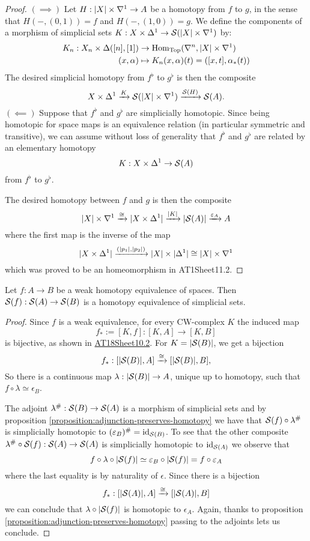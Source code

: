 \begin{proof}
$(\implies)$ Let $H:|X|\times\sx{1}\to A$ be a homotopy from $f$ to $g$, in the sense that $H(-,(0,1))=f$ and $H(-,(1,0))=g$. We define the components of a morphism of simplicial sets $K:X\times\Delta^1\to\S(|X|\times\sx{1})$ by:
\begin{align*}
    K_n:X_n\times\Delta([n],[1])&\to\Hom_\Top(\ns,|X|\times\sx{1})\\
    (x,\alpha)&\mapsto K_n(x,\alpha)(t)=([x,t],\alpha_*(t))
\end{align*}
The desired simplicial homotopy from $f^\flat$ to $g^\flat$ is then the composite
\[X\times\Delta^1\xto{K}\S(|X|\times\sx{1})\xto{\S(H)}\S(A).\]
$(\impliedby)$ Suppose that $f^\flat$ and $g^\flat$ are simplicially homotopic. Since being homotopic for space maps is an equivalence relation (in particular symmetric and transitive), we can assume without loss of generality that $f^\flat$ and $g^\flat$ are related by an elementary homotopy
\[K:X\times\Delta^1\to\S(A)\]
from $f^\flat$ to $g^\flat$.

The desired homotopy between $f$ and $g$ is then the composite
\[|X|\times\sx{1}\xto{\cong}|X\times\Delta^1|\xto{|K|}|\S(A)|\xto{\epsilon_A}A\]
where the first map is the inverse of the map
\[|X\times\Delta^1|\xto{(|p_1|,|p_2|)}|X|\times|\Delta^1|\cong|X|\times\sx{1}\]
which was proved to be an homeomorphism in AT1Sheet11.2.
\end{proof}

\begin{theorem}\label{theore:singular-complex-functor-is-homotopical}
Let $f:A\to B$ be a weak homotopy equivalence of spaces. Then $\S(f):\S(A)\to\S(B)$ is a homotopy equivalence of simplicial sets.
\end{theorem}

\begin{proof}
Since $f$ is a weak equivalence, for every CW-complex $K$ the induced map
\[f_*:=[K,f]:[K,A]\to[K,B]\]
is bijective, as shown in \hyperref[exercise:AT1Sheet10.2]{AT18Sheet10.2}. For $K=|\S(B)|$, we get a bijection
\[
f_*:[|\S(B)|,A]\xto{\cong}[|\S(B)|,B],
\]
So there is a continuous map $\lambda:|\S(B)|\to A$, unique up to homotopy, such that $f\circ\lambda\simeq\epsilon_B$.

The adjoint $\lambda^\#:\S(B)\to\S(A)$ is a morphism of simplicial sets and by proposition \ref{proposition:adjunction-preserves-homotopy} we have that $\S(f)\circ\lambda^\#$ is simplicially homotopic to $(\epsilon_B)^\#=\id_{\S(B)}$. To see that the other composite $\lambda^\#\circ\S(f):\S(A)\to\S(A)$ is simplicially homotopic to $\id_{\S(A)}$ we observe that
\[f\circ\lambda\circ|\S(f)|\simeq\epsilon_B\circ|\S(f)|=f\circ\epsilon_A\]
where the last equality is by naturality of $\epsilon$. Since there is a bijection
\[f_*:[|\S(A)|,A]\xto{\cong}[|\S(A)|,B]\]
we can conclude that $\lambda\circ|\S(f)|$ is homotopic to $\epsilon_A$. Again, thanks to proposition \ref{proposition:adjunction-preserves-homotopy} passing to the adjoints lets us conclude.
\end{proof}

